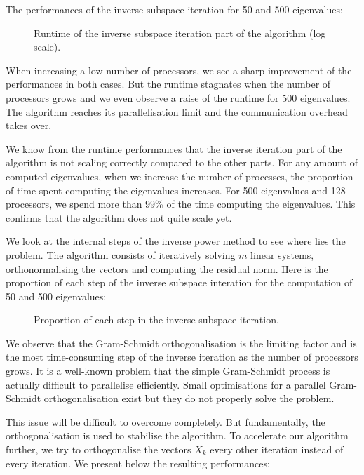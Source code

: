 The performances of the inverse subspace iteration for 50 and 500 eigenvalues:

\begin{figure}[H]
  \centering
  
  \caption{Runtime of the inverse subspace iteration part of the algorithm (log scale).}
\end{figure}

When increasing a low number of processors, we see a sharp improvement of the performances in both cases.
But the runtime stagnates when the number of processors grows and we even observe a raise of the runtime for 500 eigenvalues.
The algorithm reaches its parallelisation limit and the communication overhead takes over.

We know from the runtime performances that the inverse iteration part of the algorithm is not scaling correctly compared to the other parts.
For any amount of computed eigenvalues, when we increase the number of processes, the proportion of time spent computing the eigenvalues increases.
For 500 eigenvalues and 128 processors, we spend more than 99\% of the time computing the eigenvalues.
This confirms that the algorithm does not quite scale yet.

We look at the internal steps of the inverse power method to see where lies the problem.
The algorithm consists of iteratively solving \(m\) linear systems, orthonormalising the vectors and computing the residual norm.
Here is the proportion of each step of the inverse subspace interation for the computation of 50 and 500 eigenvalues:

\begin{figure}[H]
  \centering
  
  \caption{Proportion of each step in the inverse subspace iteration.}
\end{figure}

We observe that the Gram-Schmidt orthogonalisation is the limiting factor and is the most time-consuming step of the inverse iteration as the number of processors grows.
It is a well-known problem that the simple Gram-Schmidt process is actually difficult to parallelise efficiently.
Small optimisations for a parallel Gram-Schmidt orthogonalisation exist \cite{katagiri_parallel_gram_schmidt_2003} but they do not properly solve the problem.

This issue will be difficult to overcome completely.
But fundamentally, the orthogonalisation is used to stabilise the algorithm.
To accelerate our algorithm further, we try to orthogonalise the vectors \(X_k\) every other iteration instead of every iteration.
We present below the resulting performances:

